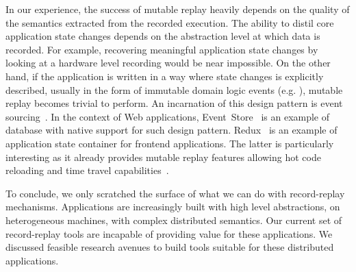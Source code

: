 In our experience, the success of mutable replay heavily depends
on the quality of the semantics extracted from the recorded execution.
The ability to distil core application state changes depends
on the abstraction level at which data is recorded. For example, recovering
meaningful application state changes by looking at a hardware level recording
would be near impossible. On the other hand, if the application is written in a
way where state changes is explicitly described, usually in the form of
immutable domain logic events (e.g. ),
mutable replay becomes trivial to perform. An incarnation of this design pattern
is event sourcing~\cite{event-sourcing}. In the context of Web applications,
Event~Store~\cite{event-store} is an example of database with native support for
such design pattern. Redux~\cite{redux} is an example of application state
container for frontend applications. The latter is particularly interesting
as it already provides mutable replay features allowing hot code reloading and
time travel capabilities~\cite{redux-hot-reloading}.

To conclude, we only scratched the surface of what we can do with record-replay
mechanisms. Applications are increasingly built with high level abstractions, on
heterogeneous machines, with complex distributed semantics. Our current set of
record-replay tools are incapable of providing value for these applications. We
discussed feasible research avenues to build tools suitable for these
distributed applications.
